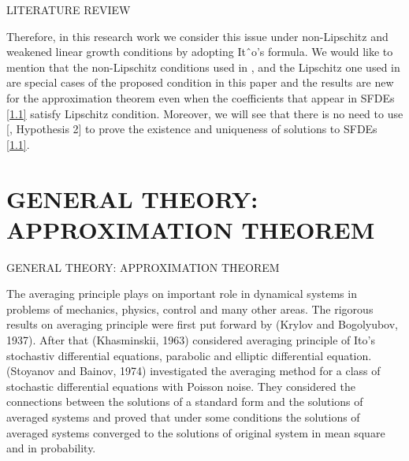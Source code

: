 \documentclass[unknownkeysallowed, compress]{beamer}
\theoremstyle{plain}
\begin{document}
\begin{frame}[allowframebreaks]{LITERATURE REVIEW}
\par  Therefore, in this research work we consider this issue under non-Lipschitz
and weakened linear growth conditions by adopting Itˆo’s formula. We would like
to mention that the non-Lipschitz conditions used in \cite{1},\cite{17} and the Lipschitz one
used in \cite{12} are special cases of the proposed condition in this paper and the results
are new for the approximation theorem even when the coefficients that appear in
SFDEs \eqref{1.1} satisfy Lipschitz condition. Moreover, we will see that there is no need
to use [\cite{25}, Hypothesis 2] to prove the existence and uniqueness of solutions to
SFDEs \eqref{1.1}.

\end{frame}

\section{GENERAL THEORY: APPROXIMATION THEOREM}
\begin{frame}{GENERAL THEORY: APPROXIMATION THEOREM}
\noindent
\par The averaging principle  plays on important role in dynamical systems in problems of mechanics, physics, control and many other areas. The rigorous results on averaging principle were first put forward by (Krylov and Bogolyubov, 1937). After that (Khasminskii, 1963) considered averaging principle of Ito's stochastiv differential equations, parabolic and elliptic differential equation. (Stoyanov and Bainov, 1974) investigated the averaging method for a class of stochastic differential equations with Poisson noise. They considered the connections between the solutions of a standard form and the solutions of averaged systems and proved that under some conditions the solutions of averaged systems converged to the solutions of original system in mean square and in probability.
\end{frame}
\end{document}
